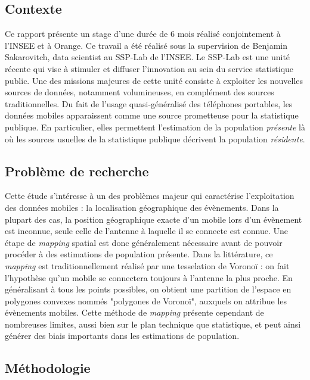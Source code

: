 

\subsection*{Contexte}

Ce rapport présente un stage d'une durée de 6 mois réalisé conjointement à l'INSEE et à Orange. Ce travail a été réalisé sous la supervision de Benjamin Sakarovitch, data scientist au SSP-Lab de l'INSEE. Le SSP-Lab est une unité récente qui vise à stimuler et diffuser l'innovation au sein du service statistique public. Une des missions majeures de cette unité consiste à exploiter les nouvelles sources de données, notamment volumineuses, en complément des sources traditionnelles. Du fait de l'usage quasi-généralisé des téléphones portables, les données mobiles apparaissent comme une source prometteuse pour la statistique publique. En particulier, elles permettent l'estimation de la population \textit{présente} là où les sources usuelles de la statistique publique décrivent la population \textit{résidente}.

\subsection*{Problème de recherche}

Cette étude s'intéresse à un des problèmes majeur qui caractérise l'exploitation des données mobiles : la localisation géographique des évènements. Dans la plupart des cas, la position géographique exacte d'un mobile lors d'un évènement est inconnue, seule celle de l'antenne à laquelle il se connecte est connue. Une étape de \textit{mapping} spatial est donc généralement nécessaire avant de pouvoir procéder à des estimations de population présente. Dans la littérature, ce \textit{mapping} est traditionnellement réalisé par une tesselation de Voronoï : on fait l'hypothèse qu'un mobile se connectera toujours à l'antenne la plus proche. En généralisant à tous les points possibles, on obtient une partition de l'espace en polygones convexes nommés "polygones de Voronoï", auxquels on attribue les évènements mobiles. Cette méthode de \textit{mapping} présente cependant de nombreuses limites, aussi bien sur le plan technique que statistique, et peut ainsi générer des biais importants dans les estimations de population.

\subsection*{Méthodologie}

